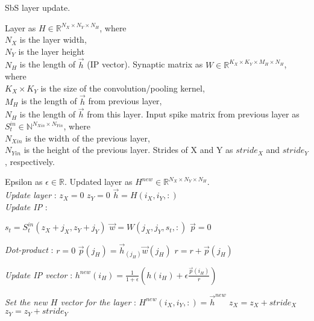 \begin{algorithm}[h!]
	\label{alg:update}
	\caption{SbS layer update.}
	
	\begin{algorithmic}[1]
		\SetAlgoLined
		\renewcommand{\algorithmicrequire}{\textbf{input:}}
		\renewcommand{\algorithmicensure}{\textbf{output:}}
		\REQUIRE Layer as $H\in\mathbb{R}^{N_X \times N_Y \times N_H}$, where\\
		$N_X$ is the layer width,\\
		$N_Y$ is the layer height\\
		$N_H$ is the length of $\vec{h}$ (IP vector).
		\REQUIRE Synaptic matrix as $W\in\mathbb{R}^{K_X \times K_Y \times M_H\times N_H}$, where\\
		$K_X \times K_Y$ is the size of the convolution/pooling kernel, \\
		$M_H$ is the length of $\vec{h}$ from previous layer,\\
		$N_H$ is the length of $\vec{h}$ from this layer.  
		\REQUIRE Input spike matrix from previous layer as $S_t^{in} \in\mathbb{N}^{N_{Xin} \times N_{Yin}}$, where\\
		$N_{Xin}$ is the width of the previous layer,\\
		$N_{Yin}$ is the height of the previous layer.
		\REQUIRE Strides of X and Y as $stride_{X}$ and $stride_{Y}$, respectively.
		
		\REQUIRE Epsilon as $\epsilon\in\mathbb{R}$.
		\ENSURE Updated layer as $H^{new}\in\mathbb{R}^{N_X \times N_Y \times N_H}$.
		\\
		\textit{Update layer} :
		\STATE $z_{X} = 0$ 
		\STATE $z_{Y} = 0$
		\STATE $\vec{h} = H(i_X, i_Y,:)$\\
		
		\textit{Update IP} :
		
		\STATE $s_t = S_t^{in}(z_{X}+j_X,z_{Y}+j_Y)$
		\STATE $\vec{w} = W(j_X,j_Y,s_t,:)$
		\STATE $\vec{p} = 0$
		
		\textit{Dot-product} :
		\STATE $r = 0$
		\STATE $\vec{p}(j_H) = \vec{h}_(j_H)\vec{w}(j_H)$
		\STATE $r = r + \vec{p}(j_H)$
		\ENDFOR
		
		
		\textit{Update IP vector} :
		\STATE
		$  h^{new}(i_H) = \frac{1}{1+\epsilon} \left(h(i_H) + \epsilon \frac{\vec{p}(i_H) }{r} \right) $
		\ENDFOR
		
		\textit{Set the new $H$ vector for the layer} :
		\STATE $H^{new}(i_X,i_Y,:) = \vec{h}^{new}$
		\ENDIF
		\ENDFOR
		\STATE $z_{X} = z_{X} + stride_{X}$
		\ENDFOR
		\STATE $z_{Y} = z_{Y} + stride_{Y}$
		\ENDFOR
		
	\end{algorithmic} 
\end{algorithm}


